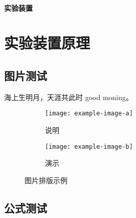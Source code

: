 \subsubsection{实验装置}%

\zhlipsum[4]


\chapter{实验装置原理}%

\zhlipsum[4]

\section{图片测试}

海上生明月，天涯共此时 good moning。
\zhlipsum[1]


\begin{figure}[h!]
	\centering
	\begin{subfigure}{0.4\linewidth}
		\centering
		\texttt{[image: example-image-a]}
		\caption{说明}\label{}
	\end{subfigure}
	\hfil
	\begin{subfigure}{0.4\linewidth}
		\centering
		\texttt{[image: example-image-b]}
		\caption{演示}\label{}
	\end{subfigure}
	\caption{图片排版示例}
\end{figure}


\section{公式测试}

